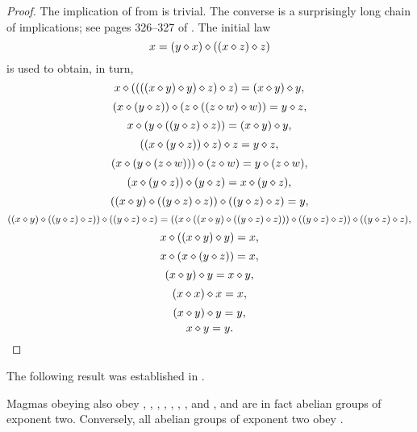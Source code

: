 \begin{proof}\leanok  The implication of  from  is trivial.  The converse is a surprisingly long chain of implications; see pages 326--327 of \cite{Kisielewicz2}.  The initial law
$$ x = (y \diamond x) \diamond ((x \diamond z) \diamond z)$$
is used to obtain, in turn,
$$ x \diamond ((((x \diamond y) \diamond y) \diamond z) \diamond z) = (x \diamond y) \diamond y,$$
$$(x \diamond (y \diamond z)) \diamond (z \diamond ((z \diamond w) \diamond w)) = y \diamond z,$$
$$x \diamond (y \diamond ((y \diamond z) \diamond z)) = (x \diamond y) \diamond y,$$
$$((x \diamond (y \diamond z)) \diamond z) \diamond z = y \diamond z,$$
$$(x \diamond (y \diamond (z \diamond w))) \diamond (z \diamond w) = y \diamond (z \diamond w),$$
$$(x \diamond (y \diamond z)) \diamond (y \diamond z) = x \diamond (y \diamond z),$$
$$((x \diamond y) \diamond ((y \diamond z) \diamond z)) \diamond ((y \diamond z) \diamond z) = y,$$
$$((x \diamond y) \diamond ((y \diamond z) \diamond z)) \diamond ((y \diamond z) \diamond z) = ((x \diamond ((x \diamond y) \diamond ((y \diamond z) \diamond z))) \diamond ((y \diamond z) \diamond z)) \diamond ((y \diamond z) \diamond z),$$
$$ x \diamond ((x \diamond y) \diamond y) = x,$$
$$ x \diamond (x \diamond (y \diamond z)) = x,$$
$$ (x \diamond y) \diamond y = x \diamond y,$$
$$ (x \diamond x) \diamond x = x,$$
$$ (x \diamond y) \diamond y = y,$$
$$ x \diamond y = y.$$
\end{proof}

The following result was established in \cite{mendelsohn-padmanabhan}.

\begin{theorem}[Consequences of 1571]\label{1571_impl}\leanok  Magmas obeying  also obey , , , , , , , and , and are in fact abelian groups of exponent two.  Conversely, all abelian groups of exponent two obey .
\end{theorem}

